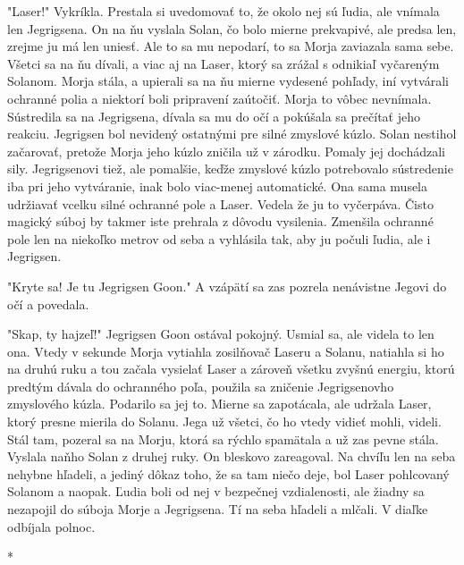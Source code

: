 \documentclass{book}
\begin{document}
"$ $Laser!"$ $ Vykríkla. Prestala si uvedomovať to, že okolo nej sú ľudia, ale vnímala len Jegrigsena. On na ňu vyslala Solan, čo bolo mierne prekvapivé, ale predsa len, zrejme ju má len uniesť. Ale to sa mu nepodarí, to sa Morja zaviazala sama sebe. Všetci sa na ňu dívali, a viac aj na Laser, ktorý sa zrážal s odnikiaľ vyčareným Solanom. Morja stála, a upierali sa na ňu mierne vydesené pohľady, iní vytvárali ochranné polia a niektorí boli pripravení zaútočiť. Morja to vôbec nevnímala. Sústredila sa na Jegrigsena, dívala sa mu do očí a pokúšala sa prečítať jeho reakciu. Jegrigsen bol nevidený ostatnými pre silné zmyslové kúzlo. Solan nestihol začarovať, pretože Morja jeho kúzlo zničila už v zárodku. Pomaly jej dochádzali sily. Jegrigsenovi tiež, ale pomalšie, keďže zmyslové kúzlo potrebovalo sústredenie iba pri jeho vytváranie, inak bolo viac-menej automatické. Ona sama musela udržiavať vcelku silné ochranné pole a Laser. Vedela že ju to vyčerpáva. Čisto magický súboj by takmer iste prehrala z dôvodu vysilenia. Zmenšila ochranné pole len na niekoľko metrov od seba a vyhlásila tak, aby ju počuli ľudia, ale i Jegrigsen.

"$ $Kryte sa! Je tu Jegrigsen Goon."$ $ A vzápätí sa zas pozrela nenávistne Jegovi do očí a povedala.

"$ $Skap, ty hajzeľ!"$ $ Jegrigsen Goon ostával pokojný. Usmial sa, ale videla to len ona. Vtedy v sekunde Morja vytiahla zosilňovač Laseru a Solanu, natiahla si ho na druhú ruku a tou začala vysielať Laser a zároveň všetku zvyšnú energiu, ktorú predtým dávala do ochranného poľa, použila sa zničenie Jegrigsenovho zmyslového kúzla. Podarilo sa jej to. Mierne sa zapotácala, ale udržala Laser, ktorý presne mierila do Solanu. Jega už všetci, čo ho vtedy vidieť mohli, videli. Stál tam, pozeral sa na Morju, ktorá sa rýchlo spamätala a už zas pevne stála. Vyslala naňho Solan z druhej ruky. On bleskovo zareagoval. Na chvíľu len na seba nehybne hľadeli, a jediný dôkaz toho, že sa tam niečo deje, bol Laser pohlcovaný Solanom a naopak. Ľudia boli od nej v bezpečnej vzdialenosti, ale žiadny sa nezapojil do súboja Morje a Jegrigsena. Tí na seba hľadeli a mlčali. V diaľke odbíjala polnoc.

\begin{center}

*

\end{center}
\end{document}
